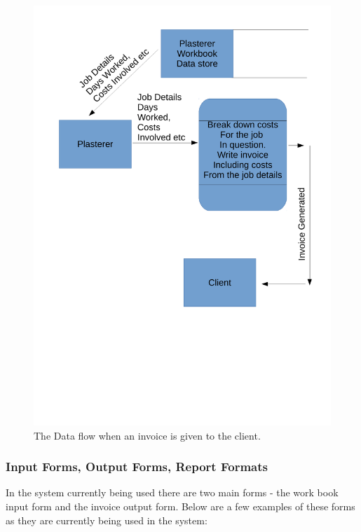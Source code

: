 \begin{figure}[H]
    \includegraphics[width=\textwidth]{./Analysis/images/GivingAnInvoiceToClient.pdf}
    \caption{The Data flow when an invoice is given to the client.} \label{fig:invoice_data_flow_diagram}
\end{figure}





\subsubsection{Input Forms, Output Forms, Report Formats}

\begin{flushleft}
	
	In the system currently being used there are two main forms - the work book input form and the invoice output form. Below are a few examples of these forms as they are currently being used in the system:

\end{flushleft}


